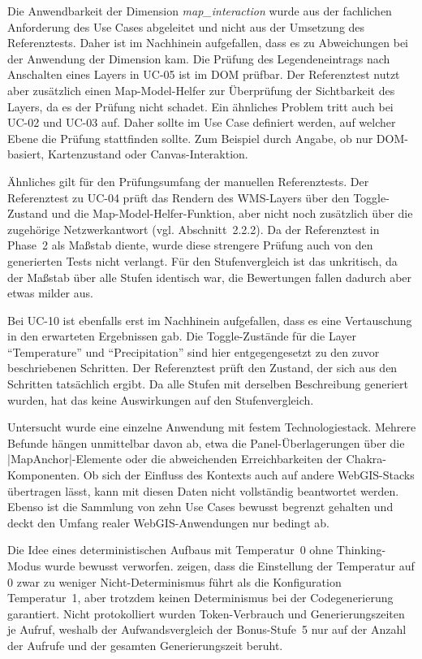 Die Anwendbarkeit der Dimension \emph{map\_interaction} wurde aus der fachlichen Anforderung des Use Cases abgeleitet und nicht aus der Umsetzung des Referenztests. Daher ist im Nachhinein aufgefallen, dass es zu Abweichungen bei der Anwendung der Dimension kam. Die Prüfung des Legendeneintrags nach Anschalten eines Layers in UC-05 ist im \ac{DOM} prüfbar. Der Referenztest nutzt aber zusätzlich einen Map-Model-Helfer zur Überprüfung der Sichtbarkeit des Layers, da es der Prüfung nicht schadet. Ein ähnliches Problem tritt auch bei UC-02 und UC-03 auf. Daher sollte im Use Case definiert werden, auf welcher Ebene die Prüfung stattfinden sollte. Zum Beispiel durch Angabe, ob nur \ac{DOM}-basiert, Kartenzustand oder Canvas-Interaktion.

Ähnliches gilt für den Prüfungsumfang der manuellen Referenztests. Der Referenztest zu UC-04 prüft das Rendern des \ac{WMS}-Layers über den Toggle-Zustand und die Map-Model-Helfer-Funktion, aber nicht noch zusätzlich über die zugehörige Netzwerkantwort (vgl. Abschnitt~2.2.2). Da der Referenztest in Phase~2 als Maßstab diente, wurde diese strengere Prüfung auch von den generierten Tests nicht verlangt. Für den Stufenvergleich ist das unkritisch, da der Maßstab über alle Stufen identisch war, die Bewertungen fallen dadurch aber etwas milder aus.

Bei UC-10 ist ebenfalls erst im Nachhinein aufgefallen, dass es eine Vertauschung in den erwarteten Ergebnissen gab. Die Toggle-Zustände für die Layer \enquote{Temperature} und \enquote{Precipitation} sind hier entgegengesetzt zu den zuvor beschriebenen Schritten. Der Referenztest prüft den Zustand, der sich aus den Schritten tatsächlich ergibt. Da alle Stufen mit derselben Beschreibung generiert wurden, hat das keine Auswirkungen auf den Stufenvergleich.

Untersucht wurde eine einzelne Anwendung mit festem Technologiestack. Mehrere Befunde hängen unmittelbar davon ab, etwa die Panel-Überlagerungen über die \code|MapAnchor|-Elemente oder die abweichenden Erreichbarkeiten der Chakra-Komponenten. Ob sich der Einfluss des Kontexts auch auf andere WebGIS-Stacks übertragen lässt, kann mit diesen Daten nicht vollständig beantwortet werden. Ebenso ist die Sammlung von zehn Use Cases bewusst begrenzt gehalten und deckt den Umfang realer WebGIS-Anwendungen nur bedingt ab.

Die Idee eines deterministischen Aufbaus mit Temperatur~0 ohne Thinking-Modus wurde bewusst verworfen. \textcite[S.~1]{ouyang_empirical_2025} zeigen, dass die Einstellung der Temperatur auf 0 zwar zu weniger Nicht-Determinismus führt als die Konfiguration Temperatur~1, aber trotzdem keinen Determinismus bei der Codegenerierung garantiert. Nicht protokolliert wurden Token-Verbrauch und Generierungszeiten je Aufruf, weshalb der Aufwandsvergleich der Bonus-Stufe~5 nur auf der Anzahl der Aufrufe und der gesamten Generierungszeit beruht.

